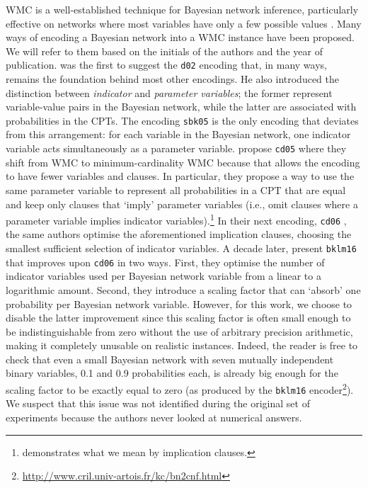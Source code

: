 WMC is a well-established technique for Bayesian network inference, particularly
effective on networks where most variables have only a few possible values
\citep{DBLP:conf/kr/Darwiche02}. Many ways of encoding a Bayesian network into a
WMC instance have been proposed. We will refer to them based on the initials of
the authors and the year of publication.  was the
first to suggest the \texttt{d02} encoding that, in many ways, remains the
foundation behind most other encodings. He also introduced the distinction
between \emph{indicator} and \emph{parameter variables}; the former represent
variable-value pairs in the Bayesian network, while the latter are associated
with probabilities in the CPTs. The encoding \texttt{sbk05}
\citep{DBLP:conf/aaai/SangBK05} is the only encoding that deviates from this
arrangement: for each variable in the Bayesian network, one indicator variable
acts simultaneously as a parameter variable. 
propose \texttt{cd05} where they shift from WMC to minimum-cardinality WMC
because that allows the encoding to have fewer variables and clauses. In
particular, they propose a way to use the same parameter variable to represent
all probabilities in a CPT that are equal and keep only clauses that `imply'
parameter variables (i.e., omit clauses where a parameter variable implies
indicator variables).\footnote{ demonstrates what we mean by
  implication clauses.} In their next encoding, \texttt{cd06}
\citep{DBLP:conf/sat/ChaviraD06}, the same authors optimise the aforementioned
implication clauses, choosing the smallest sufficient selection of indicator
variables. A decade later, \citet{DBLP:conf/ecai/BartKLM16} present
\texttt{bklm16} that improves upon \texttt{cd06} in two ways. First, they
optimise the number of indicator variables used per Bayesian network variable
from a linear to a logarithmic amount. Second, they introduce a scaling factor
that can `absorb' one probability per Bayesian network variable. However, for
this work, we choose to disable the latter improvement since this scaling factor
is often small enough to be indistinguishable from zero without the use of
arbitrary precision arithmetic, making it completely unusable on realistic
instances. Indeed, the reader is free to check that even a small Bayesian
network with seven mutually independent binary variables, 0.1 and 0.9
probabilities each, is already big enough for the scaling factor to be exactly
equal to zero (as produced by the \texttt{bklm16}
encoder\footnote{\url{http://www.cril.univ-artois.fr/kc/bn2cnf.html}}). We
suspect that this issue was not identified during the original set of
experiments because the authors never looked at numerical answers.

